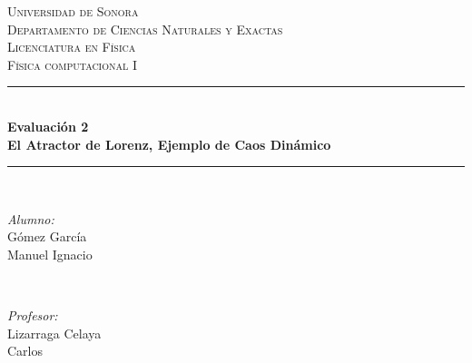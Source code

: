 \begin{titlepage}

\newcommand{\HRule}{\rule{\linewidth}{0.5mm}} %

\center %
 

\textsc{\LARGE Universidad de Sonora }\\[0.3cm] %
\textsc{\Large Departamento de Ciencias Naturales y Exactas  }\\[0.3cm]
\textsc{\Large Licenciatura en Física }\\[0.3cm]
\textsc{\Large Física computacional I}\\[0.3cm] %


\HRule \\[0.1cm]
{ \huge \bfseries Evaluación 2\\  El Atractor de Lorenz, Ejemplo de Caos Dinámico}\\[0.01cm] %
\HRule \\[1.5cm]

 

\begin{minipage}{0.4\textwidth}
\begin{flushleft} \large
\emph{Alumno:}\\
Gómez García \\Manuel Ignacio\\ %
\end{flushleft}
\end{minipage}
~
\begin{minipage}{0.4\textwidth}
\begin{flushright} \large
\emph{Profesor:} \\
Lizarraga Celaya\\Carlos\\%
\end{flushright}
\end{minipage}\\[1cm]


\end{titlepage}
